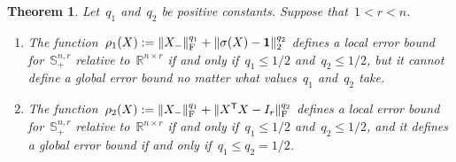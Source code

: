 \documentclass[11pt,a4paper]{article}  %
\newtheorem{theorem}{Theorem}%
\theoremstyle{definition}
\newcommand{\RR}{\mathbb{R}}
\newcommand{\res}{\rho}
\newcommand{\col}{r}
\newcommand{\stf}[1]{\mathbb{S}^{#1}}
\newcommand{\fro}{{\scriptstyle{\textnormal{F}}}}
\newcommand{\trs}{{\scriptstyle{\mathsf{T}}}}
\newcommand{\ones}{\mathbf{1}}
\begin{document}
\begin{theorem}
    \label{th:power}
    Let~$q_1$ and~$q_2$ be positive constants. Suppose that~$1 < \col < n$.
\begin{enumerate}%
    \item\label{it:sigma} The function~$\res_1(X): = \|X_{-}\|_\fro^{q_1} +\|\sigma(X) -\ones\|_2^{q_2}$
          defines a local error bound for~$\stf{n,\col}_+$ relative
        to~$\RR^{n\times \col}$ if and only if~$q_1\le 1/2$ and~$q_2\le 1/2$, but it cannot define
        a global error bound no matter what values~$q_1$ and~$q_2$ take.
    \item\label{it:fro} The function~$\res_2(X): = \|X_{-}\|_\fro^{q_1} +\|X^\trs X -I_\col\|_\fro^{q_2}$
        defines a local error bound for~$\stf{n,\col}_+$ relative
        to~$\RR^{n\times \col}$ if and only if~$q_1\le 1/2$ and~$q_2\le 1/2$, and it defines a global error bound if and
        only if~$q_1 \le q_2 = 1/2$.
\end{enumerate}
\end{theorem}
\end{document}
